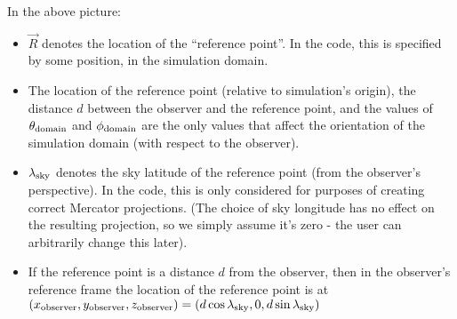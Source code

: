 \documentclass{article}
\begin{document}

In the above picture:
\begin{itemize}
    \item $\vec{R}$ denotes the location of the ``reference point''. In the code, this is specified by some position, in the simulation domain.
    \item The location of the reference point (relative to simulation's origin), the distance $d$ between the observer and the reference point, and the values of $\theta_{\rm domain}$ and $\phi_{\rm domain}$ are the only values that affect the orientation of the simulation domain (with respect to the observer).
    \item $\lambda_{\rm sky}$ denotes the sky latitude of the reference point (from the observer's perspective). In the code, this is only considered for purposes of creating correct Mercator projections. (The choice of sky longitude has no effect on the resulting projection, so we simply assume it's zero - the user can arbitrarily change this later).
    \item If the reference point is a distance $d$ from the observer, then in the observer's reference frame the location of the reference point is at $(x_{\rm observer}, y_{\rm observer}, z_{\rm observer}) = (d \cos \lambda_{\rm sky}, 0, d \sin  \lambda_{\rm sky})$
\end{itemize}
\end{document}

